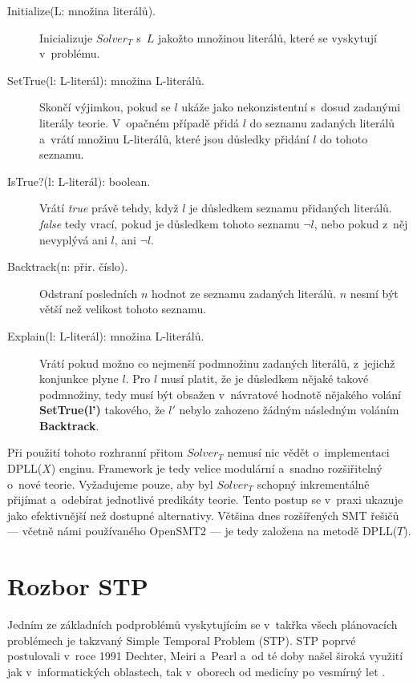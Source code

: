 \begin{description}
	\item[Initialize(L: množina literálů).] Inicializuje $Solver_T$ s~$L$ jakožto množinou literálů, které se vyskytují v~problému.
	\item[SetTrue(l: L-literál): množina L-literálů.] Skončí výjimkou, pokud se $l$ ukáže jako nekonzistentní s~dosud zadanými literály teorie. V~opačném případě přidá $l$ do seznamu zadaných literálů a~vrátí množinu L-literálů, které jsou důsledky přidání $l$ do tohoto seznamu.
	\item[IsTrue?(l: L-literál): boolean.] Vrátí \emph{true} právě tehdy, když $l$ je důsledkem seznamu přidaných literálů. \emph{false} tedy vrací, pokud je důsledkem tohoto seznamu $\neg l$, nebo pokud z~něj nevyplývá ani $l$, ani $\neg l$.
	\item[Backtrack(n: přir. číslo).] Odstraní posledních $n$ hodnot ze seznamu zadaných literálů. $n$ nesmí být větší než velikost tohoto seznamu.
	\item[Explain(l: L-literál): množina L-literálů.] Vrátí pokud možno co nejmenší podmnožinu zadaných literálů, z~jejichž konjunkce plyne $l$. Pro $l$ musí platit, že je důsledkem nějaké takové podmnožiny, tedy musí být obsažen v~návratové hodnotě nějakého volání \textbf{SetTrue(l')} takového, že $l'$ nebylo zahozeno žádným následným voláním \textbf{Backtrack}.
\end{description}

Při použití tohoto rozhranní přitom $Solver_T$ nemusí nic vědět o~implementaci DPLL($X$) enginu. Framework je tedy velice modulární a~snadno rozšiřitelný o~nové teorie. Vyžadujeme pouze, aby byl $Solver_T$ schopný inkrementálně přijímat a~odebírat jednotlivé predikáty teorie. Tento postup se v~praxi ukazuje jako efektivnější než dostupné alternativy. Většina dnes rozšířených SMT řešičů --- včetně námi používaného OpenSMT2 --- je tedy založena na metodě DPLL($T$).

\section{Rozbor STP}\label{stp}

Jedním ze základních podproblémů vyskytujícím se v~takřka všech plánovacích problémech je takzvaný Simple Temporal Problem (STP). STP poprvé postulovali v~roce 1991 Dechter, Meiri a~Pearl \cite{Dechter91} a~od té doby našel široká využití jak v~informatických oblastech, tak v~oborech od medicíny \cite{Anselma06} po vesmírný let \cite{Fukunaga97}.

